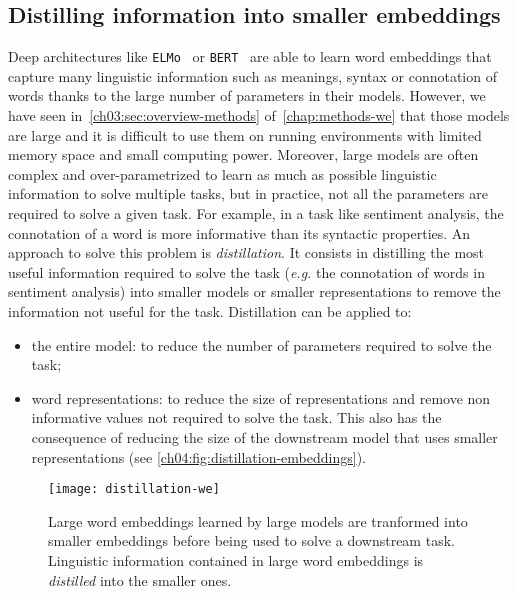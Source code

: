   \subsection{Distilling information into smaller embeddings}
    \label{ch04:subsec:distillation}
    Deep architectures like \texttt{ELMo}~\citep{peters2018elmo} or
    \texttt{BERT}~\citep{devlin2019bert} are able to learn word embeddings that
    capture many linguistic information such as meanings, syntax or connotation
    of words thanks to the large number of parameters in their models. However,
    we have seen in~\autoref{ch03:sec:overview-methods}
    of~\autoref{chap:methods-we} that those models are large and it is difficult
    to use them on running environments with limited memory space and small
    computing power. Moreover, large models are often complex and
    over-parametrized to learn as much as possible linguistic information to
    solve multiple tasks, but in practice, not all the parameters are required
    to solve a given task. For example, in a task like sentiment analysis, the
    connotation of a word is more informative than its syntactic properties.  An
    approach to solve this problem is \textit{distillation}. It consists in
    distilling the most useful information required to solve the task
    (\textit{e.g.} the connotation of words in sentiment analysis) into smaller
    models or smaller representations to remove the information not useful for
    the task. Distillation can be applied to:

    \begin{itemize}
      \item the entire model: to reduce the number of parameters required to
        solve the task;
      \item word representations: to reduce the size of representations and
        remove non informative values not required to solve the task. This also
        has the consequence of reducing the size of the downstream model that
        uses smaller representations (see
        \autoref{ch04:fig:distillation-embeddings}).
    \end{itemize}

    \begin{figure}[h]
      \centering
      \texttt{[image: distillation-we]}
      \caption[Distillation of word embeddings.] {Large word embeddings learned
      by large models are tranformed into smaller embeddings before being used
      to solve a downstream task. Linguistic information contained in large word
      embeddings is \textit{distilled} into the smaller ones.}
      \label{ch04:fig:distillation-embeddings}
    \end{figure}

